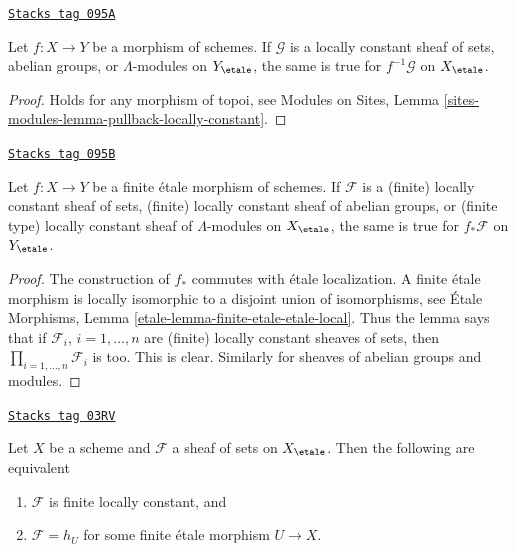 \begin{lemma}
\label{etale-cohomology-lemma-pullback-locally-constant}
\href{https://stacks.math.columbia.edu/tag/095A}{\texttt{Stacks tag 095A}}

Let $f : X \to Y$ be a morphism of schemes. If $\mathcal{G}$ is a
locally constant sheaf of sets, abelian groups, or $\Lambda$-modules
on $Y_\etale$, the same is true for $f^{-1}\mathcal{G}$
on $X_\etale$.
\end{lemma}

\begin{proof}
Holds for any morphism of topoi, see
Modules on Sites, Lemma \ref{sites-modules-lemma-pullback-locally-constant}.
\end{proof}

\begin{lemma}
\label{etale-cohomology-lemma-pushforward-locally-constant}
\href{https://stacks.math.columbia.edu/tag/095B}{\texttt{Stacks tag 095B}}

Let $f : X \to Y$ be a finite \'etale morphism of schemes.
If $\mathcal{F}$ is a (finite) locally constant sheaf of sets,
(finite) locally constant sheaf of abelian groups, or
(finite type) locally constant sheaf of $\Lambda$-modules
on $X_\etale$, the same is true for $f_*\mathcal{F}$
on $Y_\etale$.
\end{lemma}

\begin{proof}
The construction of $f_*$ commutes with \'etale localization.
A finite \'etale morphism is locally isomorphic to a disjoint union
of isomorphisms, see
\'Etale Morphisms, Lemma \ref{etale-lemma-finite-etale-etale-local}.
Thus the lemma says that if $\mathcal{F}_i$, $i = 1, \ldots, n$
are (finite) locally constant sheaves of sets, then
$\prod_{i = 1, \ldots, n} \mathcal{F}_i$ is too.
This is clear. Similarly for sheaves of abelian groups and modules.
\end{proof}

\begin{lemma}
\label{etale-cohomology-lemma-characterize-finite-locally-constant}
\href{https://stacks.math.columbia.edu/tag/03RV}{\texttt{Stacks tag 03RV}}

Let $X$ be a scheme and $\mathcal{F}$ a sheaf of sets on $X_\etale$.
Then the following are equivalent
\begin{enumerate}
\item $\mathcal{F}$ is finite locally constant, and
\item $\mathcal{F} = h_U$ for some finite \'etale morphism $U \to X$.
\end{enumerate}
\end{lemma}

